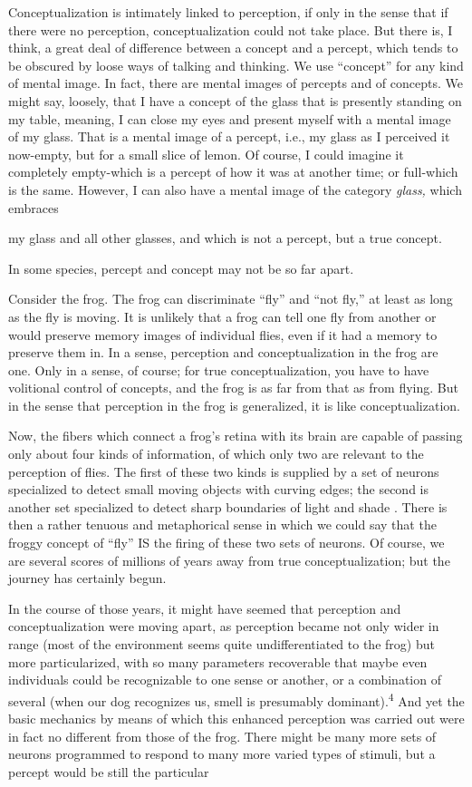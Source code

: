 Conceptualization is intimately linked to perception, if only in the sense that if there were no perception, conceptualization could not take place. But there is, I think, a great deal of difference between a concept and a percept, which tends to be obscured by loose ways of talking and thinking. We use ``concept'' for any kind of mental image. In fact, there are mental images of percepts and of concepts. We might say, loosely, that I have a concept of the glass that is presently standing on my table, meaning, I can close my eyes and present myself with a mental image of my glass. That is a mental image of a percept, i.e., my glass as I perceived it now-empty, but for a small slice of lemon. Of course, I could imagine it completely empty-which is a percept of how it was at another time; or full-which is the same. However, I can also have a mental image of the category \textit{glass,} which embraces


my glass and all other glasses, and which is not a percept, but a true concept.

In some species, percept and concept may not be so far apart.

Consider the frog. The frog can discriminate ``fly'' and ``not fly,'' at least as long as the fly is moving. It is unlikely that a frog can tell one fly from another or would preserve memory images of individual flies, even if it had a memory to preserve them in. In a sense, percep\-tion and conceptualization in the frog are one. Only in a sense, of course; for true conceptualization, you have to have volitional con\-trol of concepts, and the frog is as far from that as from flying. But in the sense that perception in the frog is generalized, it is like con\-ceptualization.

Now, the fibers which connect a frog's retina with its brain are capable of passing only about four kinds of information, of which only two are relevant to the perception of flies. The first of these two kinds is supplied by a set of neurons specialized to detect small moving objects with curving edges; the second is another set specialized to detect sharp boundaries of light and shade \citep{Burton1970}. There is then a rather tenuous and metaphorical sense in which we could say that the froggy concept of ``fly'' IS the firing of these two sets of neurons. Of course, we are several scores of millions of years away from true conceptualization; but the journey has certainly begun.

In the course of those years, it might have seemed that per\-ception and conceptualization were moving apart, as perception became not only wider in range (most of the environment seems quite un\-differentiated to the frog) but more particularized, with so many parameters recoverable that maybe even individuals could be recogniz\-able to one sense or another, or a combination of several (when our dog recognizes us, smell is presumably dominant).\textsuperscript{4} And yet the basic mechanics by means of which this enhanced perception was carried out were in fact no different from those of the frog. There might be many more sets of neurons programmed to respond to many more varied types of stimuli, but a percept would be still the particular

